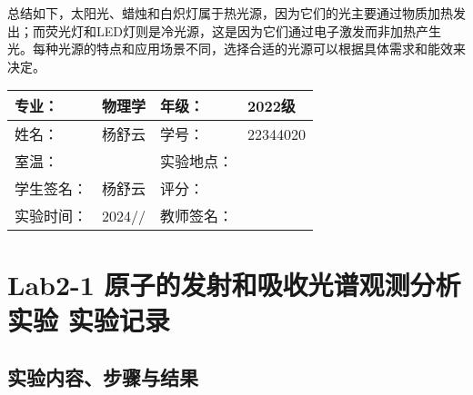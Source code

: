 \documentclass[dvipsnames, svgnames,a4paper,11pt]{article}
\begin{document}
	总结如下，太阳光、蜡烛和白炽灯属于热光源，因为它们的光主要通过物质加热发出；而荧光灯和LED灯则是冷光源，这是因为它们通过电子激发而非加热产生光。每种光源的特点和应用场景不同，选择合适的光源可以根据具体需求和能效来决定。
	
	
	
	
	
	\clearpage
	
	\begin{table}
		\renewcommand\arraystretch{1.7}
		\centering
		\begin{tabularx}{\textwidth}{|X|X|X|X|}
			\hline
			专业： & 物理学 & 年级： & 2022级 \\
			\hline
			姓名： & 杨舒云 & 学号： & 22344020\\
			\hline
			室温： &  & 实验地点： &  \\
			\hline
			学生签名：& 杨舒云 & 评分： &\\
			\hline
			实验时间：& 2024// & 教师签名：&\\
			\hline
		\end{tabularx}
	\end{table}
	
	\section{Lab2-1 原子的发射和吸收光谱观测分析实验  \quad\heiti 实验记录}
	
	\subsection{实验内容、步骤与结果}
	
\end{document}
